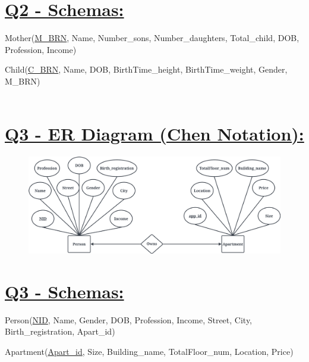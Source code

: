 \documentclass[a4paper, 12pt]{article}
\begin{document}
\section{\textbf{\uline{Q2 - Schemas:}}}
Mother(\uline{M\_BRN}, Name, Number\_sons, Number\_daughters, Total\_child, DOB, Profession, Income)

Child(\uline{C\_BRN}, Name, DOB, BirthTime\_height, BirthTime\_weight, Gender, M\_BRN) 
\\
\\
\section{\textbf{\uline{Q3 - ER Diagram (Chen Notation):}}}
\begin{figure}
    \centering
    \includegraphics[width=1\linewidth]{Q3.jpeg}
\end{figure}

\section{\textbf{\uline{Q3 - Schemas:}}}
Person(\uline{NID}, Name, Gender, DOB, Profession, Income, Street, City, Birth\_registration, Apart\_id)

Apartment(\uline{Apart\_id}, Size, Building\_name, TotalFloor\_num, Location, Price)
\end{document}
